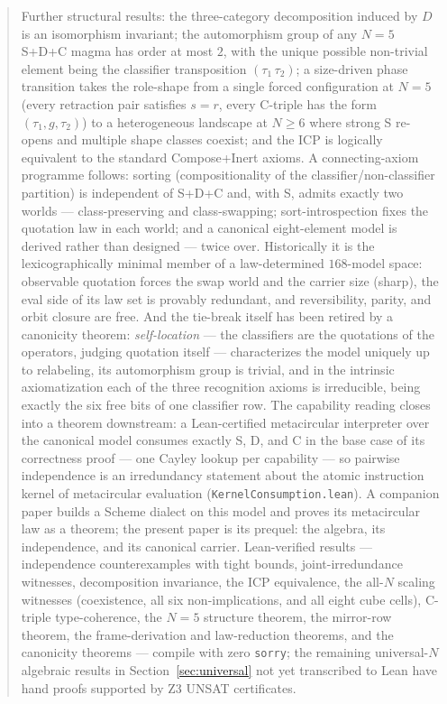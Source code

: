 \documentclass[sigconf,screen]{acmart}
\theoremstyle{remark}
\begin{document}
\begin{abstract}
Further structural results: the three-category decomposition induced by $D$ is an isomorphism invariant; the automorphism group of any $N\!=\!5$ S+D+C magma has order at most $2$, with the unique possible non-trivial element being the classifier transposition $(\tau_1\,\tau_2)$; a size-driven phase transition takes the role-shape from a single forced configuration at $N\!=\!5$ (every retraction pair satisfies $s = r$, every C-triple has the form $(\tau_1, g, \tau_2)$) to a heterogeneous landscape at $N \geq 6$ where strong S re-opens and multiple shape classes coexist; and the ICP is logically equivalent to the standard Compose+Inert axioms. A connecting-axiom programme follows: sorting (compositionality of the classifier/non-classifier partition) is independent of S+D+C and, with S, admits exactly two worlds --- class-preserving and class-swapping; sort-introspection fixes the quotation law in each world; and a canonical eight-element model is derived rather than designed --- twice over. Historically it is the lexicographically minimal member of a law-determined $168$-model space: observable quotation forces the swap world and the carrier size (sharp), the eval side of its law set is provably redundant, and reversibility, parity, and orbit closure are free. And the tie-break itself has been retired by a canonicity theorem: \emph{self-location} --- the classifiers are the quotations of the operators, judging quotation itself --- characterizes the model uniquely up to relabeling, its automorphism group is trivial, and in the intrinsic axiomatization each of the three recognition axioms is irreducible, being exactly the six free bits of one classifier row. The capability reading closes into a theorem downstream: a Lean-certified metacircular interpreter over the canonical model consumes exactly S, D, and C in the base case of its correctness proof --- one Cayley lookup per capability --- so pairwise independence is an irredundancy statement about the atomic instruction kernel of metacircular evaluation (\texttt{KernelConsumption.lean}). A companion paper builds a Scheme dialect on this model and proves its metacircular law as a theorem; the present paper is its prequel: the algebra, its independence, and its canonical carrier. Lean-verified results --- independence counterexamples with tight bounds, joint-irredundance witnesses, decomposition invariance, the ICP equivalence, the all-$N$ scaling witnesses (coexistence, all six non-implications, and all eight cube cells), C-triple type-coherence, the $N\!=\!5$ structure theorem, the mirror-row theorem, the frame-derivation and law-reduction theorems, and the canonicity theorems --- compile with zero \texttt{sorry}; the remaining universal-$N$ algebraic results in Section~\ref{sec:universal} not yet transcribed to Lean have hand proofs supported by Z3 UNSAT certificates.
\end{abstract}
\end{document}
